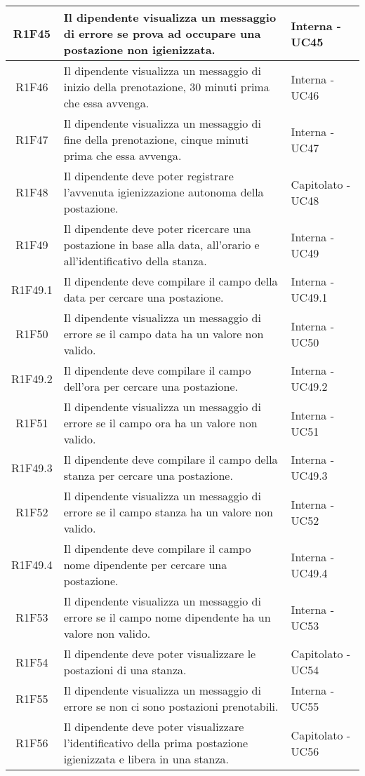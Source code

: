 \begin{center}
\begin{longtable}{|c|p{10cm}|p{4cm}|}
		\hline
		R1F45&Il dipendente visualizza un messaggio di errore se prova ad occupare una postazione non igienizzata. &Interna - UC45 	\\
		\hline	
		R1F46&Il dipendente visualizza un messaggio di inizio della prenotazione, 30 minuti prima che essa avvenga.	&Interna - UC46 	\\
		\hline
		R1F47&Il dipendente visualizza un messaggio di fine della prenotazione, cinque minuti prima che essa avvenga.	&Interna - UC47 	\\
		\hline
		R1F48&Il dipendente deve poter registrare l'avvenuta igienizzazione autonoma della postazione.	&Capitolato - UC48	\\
		\hline	
		R1F49&Il dipendente deve poter ricercare una postazione in base alla data, all'orario e all'identificativo della stanza.	&Interna - UC49	\\
		\hline
		R1F49.1&Il dipendente deve compilare il campo della data per cercare una postazione.	&Interna - UC49.1	\\
		\hline
		R1F50&Il dipendente visualizza un messaggio di errore se il campo data ha un valore non valido.	&Interna - UC50	\\
		\hline
		R1F49.2&Il dipendente deve compilare il campo dell'ora per cercare una postazione.	&Interna - UC49.2	\\
		\hline
		R1F51&Il dipendente visualizza un messaggio di errore se il campo ora ha un valore non valido.	&Interna - UC51	\\
		\hline
		R1F49.3&Il dipendente deve compilare il campo della stanza per cercare una postazione.		&Interna - UC49.3	\\
		\hline
		R1F52&Il dipendente visualizza un messaggio di errore se il campo stanza ha un valore non valido.	&Interna - UC52	\\
		\hline
		R1F49.4&Il dipendente deve compilare il campo nome dipendente per cercare una postazione.	&Interna - UC49.4	\\
		\hline
		R1F53&Il dipendente visualizza un messaggio di errore se il campo nome dipendente ha un valore non valido.	&Interna - UC53	\\
		\hline
		R1F54&Il dipendente deve poter visualizzare le postazioni di una stanza.	&Capitolato - UC54	\\
		\hline
		R1F55&Il dipendente visualizza un messaggio di errore se non ci sono postazioni prenotabili.	&Interna - UC55	\\
		\hline
		R1F56&Il dipendente deve poter visualizzare l'identificativo della prima postazione igienizzata e libera in una stanza.	&Capitolato - UC56	\\

\end{longtable}
\end{center}
